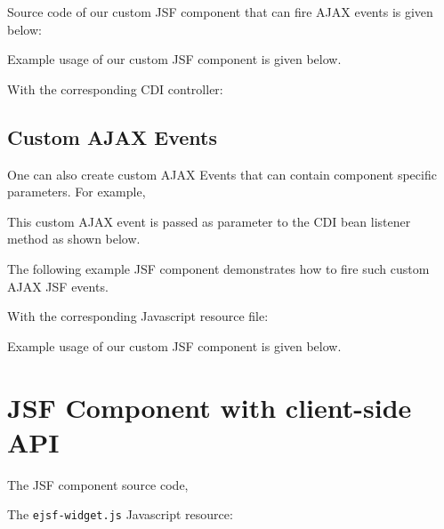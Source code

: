 Source code of our custom JSF component that can fire AJAX events is given below:


Example usage of our custom JSF component is given below.


With the corresponding CDI controller:


\subsection{Custom AJAX Events}

One can also create custom AJAX Events that can contain component specific parameters.
For example,


This custom AJAX event is passed as parameter to the CDI bean listener method as shown below.


The following example JSF component demonstrates how to fire such custom AJAX JSF events.


With the corresponding Javascript resource file:


Example usage of our custom JSF component is given below.


\section{JSF Component with client-side API}
The JSF component source code,


The \texttt{ejsf-widget.js} Javascript resource:


